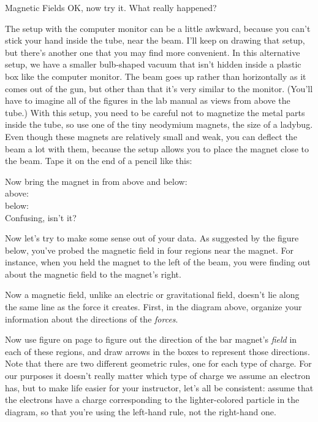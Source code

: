 \begin{lab}{Magnetic Fields}
OK, now try it. What really happened? \fieldslabshortanswer

The setup with the computer monitor can be a little awkward, because you can't
stick your hand inside the tube, near the beam. I'll keep on drawing that
setup, but there's another one that you may find more convenient. In this
alternative setup, we have a smaller bulb-shaped vacuum that isn't hidden
inside a plastic box like the computer monitor. The beam goes up rather than
horizontally as it comes out of the gun, but other than that it's very similar
to the monitor. 
(You'll have to imagine all of the figures in the lab manual
as views from above the tube.)
With this setup, you need to be careful not to magnetize
the metal parts inside the tube, so use one of the tiny neodymium magnets,
the size of a ladybug. Even though these magnets are relatively small and weak,
you can deflect the beam a lot with them, because the setup allows you to
place the magnet close to the beam. Tape it on the end of a pencil like this:


Now bring the magnet in from above and below:\\
above: \fieldslabshortanswer\\
below: \fieldslabshortanswer\\

Confusing, isn't it?


Now let's try to make some sense out of your data. As suggested by the figure below,
you've probed the magnetic field in four regions near the magnet. For instance, when
you held the magnet to the left of the beam, you were finding out about the magnetic
field to the magnet's right.


Now a magnetic field, unlike an electric or gravitational field, doesn't lie along
the same line as the force it creates. First, in the diagram above, organize your
information about the directions of the \emph{forces}.


Now use figure  on page \pageref{fig:righthandrule} to figure
out the direction of the bar magnet's \emph{field} in each of these regions, and draw arrows
in the boxes to represent those directions. Note that there are two different geometric
rules, one for each type of charge. For our purposes it doesn't really matter which
type of charge we assume an electron has, but to make life easier for your instructor,
let's all be consistent: assume that the electrons have a charge corresponding to the
lighter-colored particle in the diagram, so that you're using the left-hand rule, not
the right-hand one.


\end{lab}
